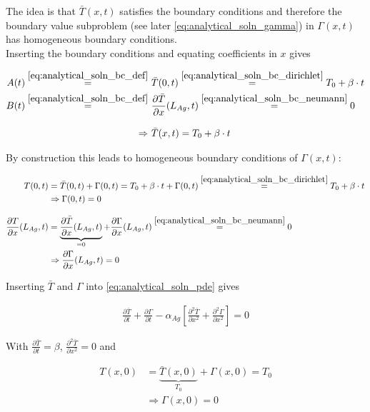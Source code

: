 \documentclass{scrartcl}[12pt, halfparskip]
\numberwithin{equation}{section}
\numberwithin{figure}{section}
\numberwithin{table}{section}
\begin{document}
The idea is that $\bar{T}(x,t)$ satisfies the boundary conditions and therefore the boundary value subproblem (see later \cref{eq:analytical_soln_gamma}) in $\Gamma(x,t)$ has homogeneous boundary conditions. \\
Inserting the boundary conditions and equating coefficients in $x$ gives

\begin{align}
	A(t) \stackrel{\eqref{eq:analytical_soln_bc_def}}{=} & \ \bar{T}(0,t)  \stackrel{\eqref{eq:analytical_soln_bc_dirichlet}}{=} T_0 + \beta \cdot t \\
	B(t) \stackrel{\eqref{eq:analytical_soln_bc_def}}{=} & \ \frac{\partial \bar{T}}{\partial x}(L_{Ag},t) \stackrel{\eqref{eq:analytical_soln_bc_neumann}}{=} 0 \\[2ex]
	\Rightarrow & \ \bar{T}(x,t) = T_0 + \beta \cdot t
\end{align}



By construction this leads to homogeneous boundary conditions of $\Gamma(x,t)$:

\begin{align}
	T(0,t) & = \bar{T}(0,t) + \Gamma(0,t) = T_0 + \beta \cdot t + \Gamma(0,t) \stackrel{\eqref{eq:analytical_soln_bc_dirichlet}}{=} T_0 + \beta \cdot t \\
	 &\Rightarrow \Gamma(0,t) = 0 \\[2ex]
	\frac{\partial T}{\partial x}(L_{Ag},t) & = \underbrace{\frac{\partial \bar{T}}{\partial x}(L_{Ag},t)}_{= 0} + \frac{\partial \Gamma}{\partial x}(L_{Ag},t) \stackrel{\eqref{eq:analytical_soln_bc_neumann}}{=} 0 \\
	 &\Rightarrow \frac{\partial \Gamma}{\partial x}(L_{Ag},t) = 0
\end{align}


Inserting $\bar{T}$ and $\Gamma$ into \cref{eq:analytical_soln_pde} gives

\begin{align}
	\frac{\partial \bar{T}}{\partial t} + \frac{\partial \Gamma}{\partial t} - \alpha_{Ag} \left[ \frac{\partial^2 \bar{T}}{\partial x^2} + \frac{\partial^2 \Gamma}{\partial x^2} \right] = 0
\end{align}
	

	
	
With $\frac{\partial \bar{T}}{\partial t} = \beta$, $\frac{\partial^2 \bar{T}}{\partial x^2} = 0$ and

\begin{align}
T(x,0) & = \underbrace{\bar{T}(x,0)}_{T_0} + \Gamma(x,0) = T_0 \\
& \Rightarrow \Gamma(x,0) = 0
\end{align}
\end{document}
